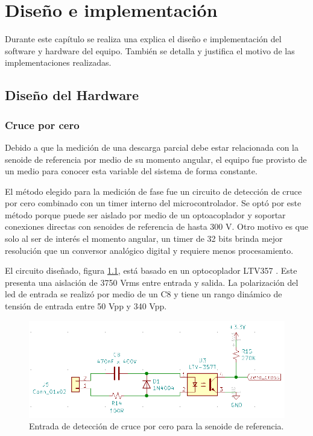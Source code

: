 \chapter{Diseño e implementación} %

\label{Chapter3} %
Durante este capítulo se realiza una explica el diseño e implementación del software y hardware del equipo. También se detalla y justifica el motivo de las implementaciones realizadas.

\section{Diseño del Hardware}
\subsection{Cruce por cero}

Debido a que la medición de una descarga parcial debe estar relacionada con la senoide de referencia por medio de su momento angular, el equipo fue provisto de un medio para conocer esta variable del sistema de forma constante.

El método elegido para la medición de fase fue un circuito de detección de cruce por cero combinado con un timer interno del microcontrolador. Se optó por este método porque puede ser aislado por medio de un optoacoplador y soportar conexiones directas con senoides de referencia de hasta 300 V. Otro motivo es que solo al ser de interés el momento angular, un timer de 32 bits brinda mejor resolución que un conversor analógico digital y requiere menos procesamiento.

El circuito diseñado, figura \ref{fig:schZeroCross}, está basado en un optocoplador LTV357 \citep{opto:ltv357}. Este presenta una aislación de 3750 Vrms entre entrada y salida. La polarización del led de entrada se realizó por medio de un C8 y tiene un rango dinámico de tensión de entrada entre 50 Vpp y 340 Vpp. 

\begin{figure}[ht]
	\centering
	\includegraphics[width=130mm]{./Figures/schZeroCross.png}
	\caption{Entrada de detección de cruce por cero para la senoide de referencia.}
	\label{fig:schZeroCross}
\end{figure}


